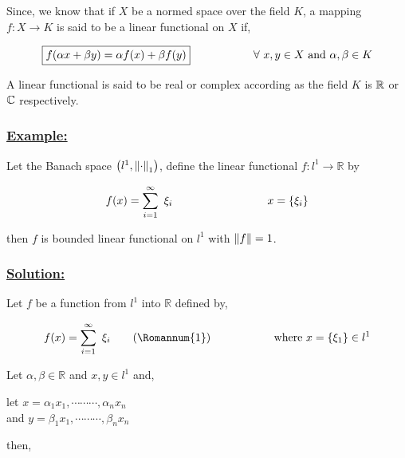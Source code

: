 \documentclass[a4paper,12pt]{article}
\begin{document}
    \begin{tcolorbox}
        Since, we know that if $X$ be a normed space over the field $K$, a mapping $f : X\to K$ is said to be a linear functional on $X$ if,

        \[\boxed{f(\alpha x + \beta y) = \alpha f(x) + \beta f(y)} \hspace*{2cm} \forall\ x,y\in X\ \mbox{and}\ \alpha, \beta\in K\]

        A linear functional is said to be real or complex according as the field $K$ is ${\bf \mathbb{R}}$ or ${\bf \mathbb{C}}$ respectively.
    \end{tcolorbox}

    \subsubsection*{\underline{{\bf Example:}}}

    Let the Banach space $\left(l^1, \norm{\cdot}_1\right)$, define the linear functional $f : l^1\to \mathbb{R}$ by

    \[f(x) = \sum_{i=1}^{\infty}\ \xi_i\hspace*{3cm} x = \left\{\xi_i\right\}\]

    then $f$ is bounded linear functional on $l^1$ with $\norm{f} = 1$.

    \subsubsection*{\underline{{\bf Solution:}}}

    Let $f$ be a function from $l^1$ into $\mathbb{R}$ defined by,
    
    \begin{equation*}
        f(x) = \sum_{i=1}^{\infty}\ \xi_i \tag*{(\Romannum{1})}\hspace*{2cm} \mbox{where}\ x=\left\{\xi_1\right\}\in l^1
    \end{equation*}

    Let $\alpha, \beta \in \mathbb{R}$ and $x,y\in l^1$ and,

    \begin{center}
        let \hspace*{0.5cm} $x = \alpha_1 x_1, \cdots \cdots \cdots, \alpha_n x_n$\\
        and $y = \beta_1 x_1, \cdots \cdots \cdots, \beta_n x_n$
    \end{center}

    then,
\end{document}
